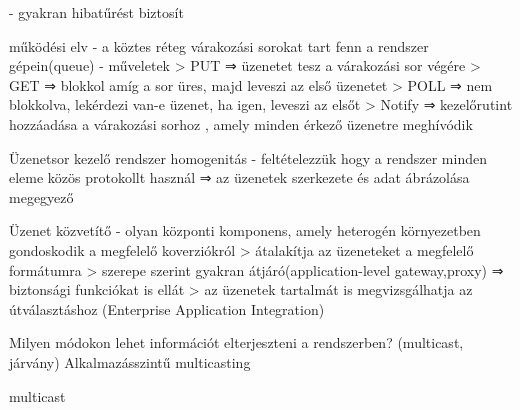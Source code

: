 \documentclass[12pt]{article}
\begin{document}
\begin{description}
                                                                        - gyakran hibatűrést biztosít
                                                                    \item működési elv
                                                                        - a köztes réteg várakozási sorokat tart fenn a rendszer gépein(queue)
                                                                        - műveletek
                                                                        > PUT    ⇒ üzenetet tesz a várakozási sor végére
                                                                        > GET    ⇒ blokkol amíg a sor üres, majd leveszi az első üzenetet
                                                                        > POLL 	 ⇒ nem blokkolva, lekérdezi van-e üzenet, ha igen, leveszi az elsőt
                                                                        > Notify ⇒	kezelőrutint hozzáadása a várakozási sorhoz , amely minden érkező üzenetre meghívódik
                                                                    \item Üzenetsor kezelő rendszer homogenitás
                                                                        - feltételezzük hogy a rendszer minden eleme közös protokollt használ
                                                                        ⇒ az üzenetek szerkezete és adat ábrázolása megegyező
                                                                    \item Üzenet közvetítő
                                                                        - olyan központi komponens, amely heterogén környezetben gondoskodik a megfelelő koverziókról
                                                                        > átalakítja az üzeneteket a megfelelő formátumra
                                                                        > szerepe szerint gyakran átjáró(application-level gateway,proxy) ⇒ biztonsági funkciókat is ellát
                                                                        > az üzenetek tartalmát is megvizsgálhatja az útválasztáshoz (Enterprise Application Integration)	
                                                                    \item  Milyen módokon lehet információt elterjeszteni a rendszerben? (multicast, járvány)
                                                                        Alkalmazásszintű multicasting
                                                                    \item multicast 

\end{description}
\end{document}
